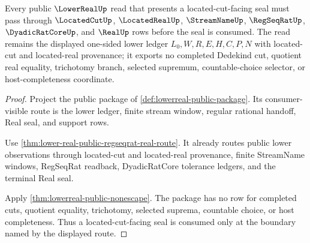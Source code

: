\begin{theorem}
\label{thm:lower-real-located-cut-seal-boundary}
Every public $\LowerRealUp$ read that presents a located-cut-facing seal must pass through $\LocatedCutUp$, $\LocatedRealUp$, $\StreamNameUp$, $\RegSeqRatUp$, $\DyadicRatCoreUp$, and $\RealUp$ rows before the seal is consumed. The read remains the displayed one-sided lower ledger $L_0,W,R,E,H,C,P,N$ with located-cut and located-real provenance; it exports no completed Dedekind cut, quotient real equality, trichotomy branch, selected supremum, countable-choice selector, or host-completeness coordinate.
\end{theorem}
\begin{proof}
Project the public package of \autoref{def:lowerreal-public-package}. Its consumer-visible route is the lower ledger, finite stream window, regular rational handoff, Real seal, and support rows.

Use \autoref{thm:lower-real-public-regseqrat-real-route}. It already routes public lower observations through located-cut and located-real provenance, finite StreamName windows, RegSeqRat readback, DyadicRatCore tolerance ledgers, and the terminal Real seal.

Apply \autoref{thm:lowerreal-public-nonescape}. The package has no row for completed cuts, quotient equality, trichotomy, selected suprema, countable choice, or host completeness. Thus a located-cut-facing seal is consumed only at the boundary named by the displayed route.
\end{proof}

